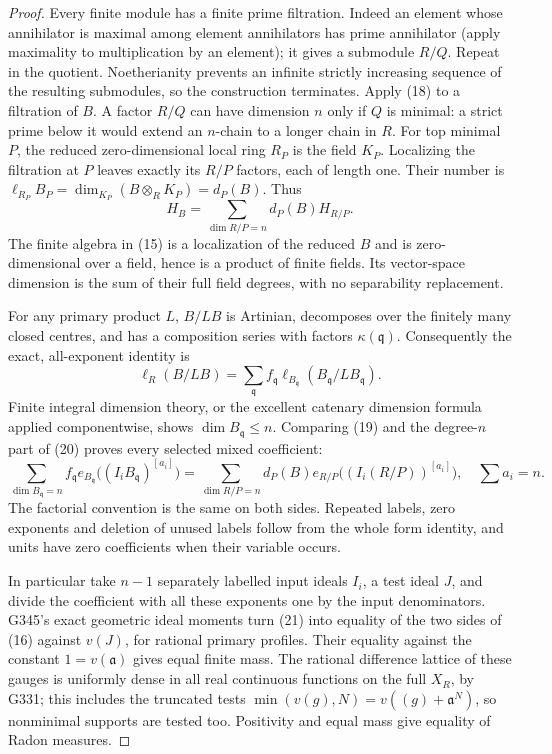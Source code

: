 \documentclass[11pt]{article}
\begin{document}
\begin{proof}
Every finite module has a finite prime filtration. Indeed an element
whose annihilator is maximal among element annihilators has prime
annihilator (apply maximality to multiplication by an element);
it gives a submodule \(R/Q\). Repeat in the quotient. Noetherianity
prevents an infinite strictly increasing sequence of the resulting
submodules, so the construction terminates. Apply (18) to a
filtration of \(B\). A factor \(R/Q\) can have dimension \(n\)
only if \(Q\) is minimal: a strict prime below it would extend an
\(n\)-chain to a longer chain in \(R\).
For top minimal \(P\), the reduced zero-dimensional local ring
\(R_P\) is the field \(K_P\). Localizing the filtration at \(P\)
leaves exactly its \(R/P\) factors, each of length one. Their
number is
\(\ell_{R_P}B_P=\dim_{K_P}(B\otimes_R K_P)=d_P(B)\).
Thus
\[
 H_B=\sum_{\dim R/P=n}d_P(B)H_{R/P}.                          \tag{19}
\]
The finite algebra in (15) is a localization of the reduced \(B\)
and is zero-dimensional over a field, hence is a product of
finite fields. Its vector-space dimension is the sum of their
full field degrees, with no separability replacement.

For any primary product \(L\), \(B/LB\) is Artinian, decomposes
over the finitely many closed centres, and has a composition
series with factors \(\kappa(\mathfrak q)\). Consequently the
exact, all-exponent identity is
\[
 \ell_R(B/LB)=\sum_{\mathfrak q}f_{\mathfrak q}
                      \ell_{B_{\mathfrak q}}(B_{\mathfrak q}/LB_{\mathfrak q}).
                                                               \tag{20}
\]
Finite integral dimension theory, or the excellent catenary
dimension formula applied componentwise, shows
\(\dim B_{\mathfrak q}\leq n\).
Comparing (19) and the degree-\(n\) part of (20) proves every
selected mixed coefficient:
\[
 \sum_{\dim B_{\mathfrak q}=n}f_{\mathfrak q}
 e_{B_{\mathfrak q}}\big((I_iB_{\mathfrak q})^{[a_i]}\big)
 =\sum_{\dim R/P=n}d_P(B)
 e_{R/P}\big((I_i(R/P))^{[a_i]}\big),\quad \sum a_i=n.          \tag{21}
\]
The factorial convention is the same on both sides. Repeated
labels, zero exponents and deletion of unused labels follow from
the whole form identity, and units have zero coefficients when
their variable occurs.

In particular take \(n-1\) separately labelled input ideals
\(I_i\), a test ideal \(J\), and divide the coefficient with all
these exponents one by the input denominators. G345's exact
geometric ideal moments turn (21) into equality of the two sides
of (16) against \(v(J)\), for rational primary profiles.
Their equality against the constant \(1=v(\mathfrak a)\) gives
equal finite mass. The rational difference lattice of these
gauges is uniformly dense in all real continuous functions on
the full \(X_R\), by G331; this includes the truncated tests
\(\min(v(g),N)=v((g)+\mathfrak a^N)\), so nonminimal supports
are tested too. Positivity and equal mass give equality of
Radon measures.


\end{proof}
\end{document}
